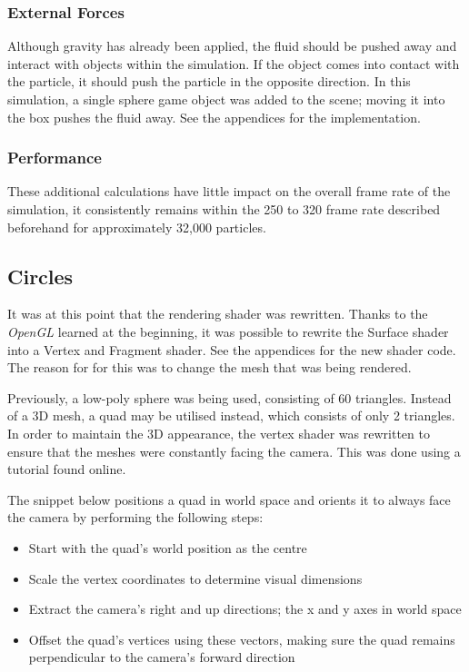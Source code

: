 \documentclass[12pt]{article}
\begin{document}
    \subsubsection{External Forces}

    Although gravity has already been applied, the fluid should be pushed away and interact with objects within the simulation. If the object comes into contact with the particle, it should push the particle in the opposite direction. In this simulation, a single sphere game object was added to the scene; moving it into the box pushes the fluid away. See the appendices for the implementation.

    \subsubsection{Performance}

    These additional calculations have little impact on the overall frame rate of the simulation, it consistently remains within the 250 to 320 frame rate described beforehand for approximately 32,000 particles.

    \subsection{Circles}

    It was at this point that the rendering shader was rewritten. Thanks to the \textit{OpenGL} learned at the beginning, it was possible to rewrite the Surface shader into a Vertex and Fragment shader. See the appendices for the new shader code. The reason for for this was to change the mesh that was being rendered. 
    
    Previously, a low-poly sphere was being used, consisting of 60 triangles. Instead of a 3D mesh, a quad may be utilised instead, which consists of only 2 triangles. In order to maintain the 3D appearance, the vertex shader was rewritten to ensure that the meshes were constantly facing the camera. This was done using a tutorial found online\cite{lague2}.

    The snippet below positions a quad in world space and orients it to always face the camera by performing the following steps:
    \begin{itemize}
        \item Start with the quad's world position as the centre
        \item Scale the vertex coordinates to determine visual dimensions
        \item Extract the camera's right and up directions; the x and y axes in world space
        \item Offset the quad's vertices using these vectors, making sure the quad remains perpendicular to the camera's forward direction
    \end{itemize}
\end{document}
